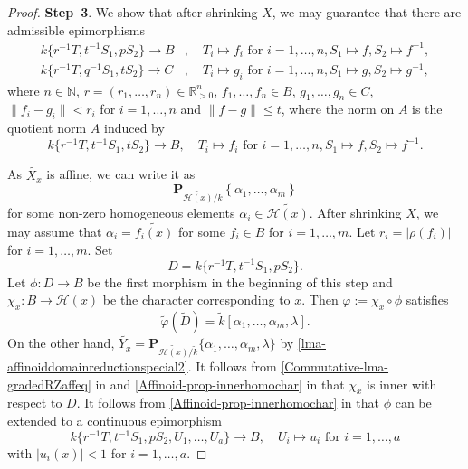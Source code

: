 \begin{proof}
    \textbf{Step~3}. We show that after shrinking $X$, we may guarantee that there are admissible epimorphisms 
    \begin{equation}\label{eq-admepiintermstep}
        \begin{aligned}
        k\{r^{-1}T,t^{-1}S_1,pS_2\}\rightarrow B &,\quad T_i\mapsto f_i \text{ for } i=1,\ldots,n,S_1\mapsto f ,S_2\mapsto f^{-1},\\
        k\{r^{-1}T,q^{-1}S_1,tS_2\}\rightarrow C &,\quad T_i\mapsto g_i \text{ for } i=1,\ldots,n,S_1\mapsto g ,S_2\mapsto g^{-1},
        \end{aligned}
    \end{equation}
    where $n\in \mathbb{N}$, $r=(r_1,\ldots,r_n)\in \mathbb{R}^n_{>0}$, $f_1,\ldots,f_n\in B$, $g_1,\ldots,g_n\in C$, $\|f_i-g_i\|<r_i$ for $i=1,\ldots,n$ and $\|f-g\|\leq t$, where the norm on $A$ is the quotient norm $A$ induced by
    \[
        k\{r^{-1}T,t^{-1}S_1,tS_2\}\rightarrow B,\quad T_i\mapsto f_i\text{ for } i=1,\ldots,n, S_1\mapsto f, S_2\mapsto f^{-1}.
    \]

    As $\widetilde{X_x}$ is affine, we can write it as 
    \[
        \mathbf{P}_{\widetilde{\mathscr{H}(x)}/\tilde{k}}\left\{\alpha_1,\ldots,\alpha_m\right\}  
    \]
    for some non-zero homogeneous elements $\alpha_i\in \widetilde{\mathscr{H}(x)}$. After shrinking $X$, we may assume that $\alpha_i=\widetilde{f_i(x)}$ for some $f_i\in B$ for $i=1,\ldots,m$. Let $r_i=|\rho(f_i)|$ for $i=1,\ldots,m$. Set 
    \[
        D=k\{r^{-1}T,t^{-1}S_1,pS_2\}.  
    \]
    Let $\phi:D\rightarrow B$ be the first morphism in the beginning of this step and $\chi_x:B\rightarrow \mathscr{H}(x)$ be the character corresponding to $x$. Then $\varphi:=\chi_x\circ \phi$ satisfies
    \[
        \tilde{\varphi}(\tilde{D})=\tilde{k}[\alpha_1,\ldots,\alpha_m,\lambda].
    \]
    On the other hand, $\widetilde{Y_x}=\mathbf{P}_{\widetilde{\mathscr{H}(x)}/\tilde{k}}\{\alpha_1,\ldots,\alpha_m,\lambda\}$ by \cref{lma-affinoiddomainreductionspecial2}. It follows from \cref{Commutative-lma-gradedRZaffeq} in  and \cref{Affinoid-prop-innerhomochar} in  that $\chi_x$ is inner with respect to $D$. It follows from \cref{Affinoid-prop-innerhomochar} in  that $\phi$ can be extended to a continuous epimorphism
    \[
        k\{r^{-1}T,t^{-1}S_1,pS_2,U_1,\ldots,U_a\}\rightarrow B,\quad U_i\mapsto u_i\text{ for }i=1,\ldots,a  
    \]
    with $|u_i(x)|<1$ for $i=1,\ldots,a$.


\end{proof}
